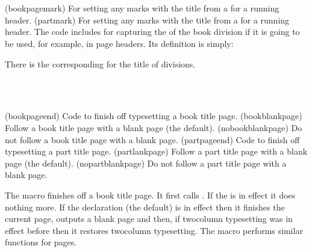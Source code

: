 \begin{syntax}
\cmd{\bookpagemark} \\
\cmd{\partmark} \\
\end{syntax}
\glossary(bookpagemark)%
  {}%
  {For setting any marks with the title from a  for a running header.}
\glossary(partmark)%
  {}%
  {For setting any marks with the title from a  for a running header.}
The \cmd{\book} code includes \cmd{\bookpagemark} for capturing
the  of the book division if it is going to be used, 
for example, in page headers. Its definition is simply:
\begin{lcode}
\newcommand*{\bookpagemark}[1]{}
\end{lcode}
There is the corresponding \cmd{\partmark} for the title of \cmd{\part} 
divisions.

\begin{syntax}
\cmd{\bookpageend} \cmd{\bookblankpage} \cmd{\nobookblankpage} \\
\cmd{\partpageend} \cmd{\partblankpage} \cmd{\nopartblankpage} \\
\end{syntax}
\glossary(bookpageend)%
  {}%
  {Code to finish off typesetting a book title page.}
\glossary(bookblankpage)%
  {}%
  {Follow a book title page with a blank page (the default).}
\glossary(nobookblankpage)%
  {}%
  {Do not follow a book title page with a blank page.}
\glossary(partpageend)%
  {}%
  {Code to finish off typesetting a part title page.}
\glossary(partlankpage)%
  {}%
  {Follow a part title page with a blank page (the default).}
\glossary(nopartblankpage)%
  {}%
  {Do not follow a part title page with a blank page.}

The macro \cmd{\bookpageend} finishes off a book title page. It first
calls \cmd{\afterbookskip}. If the \cmd{\nobookblankpage} is in effect
it does nothing more. If the declaration \cmd{\bookblankpage} (the default)
is in effect then it finishes the current page, outputs a blank page and then,
if twocolumn typesetting was in effect before \cmd{\book} then it restores
twocolumn typesetting. The macro \cmd{\partpageend} performs similar
functions for \cmd{\part} pages.

